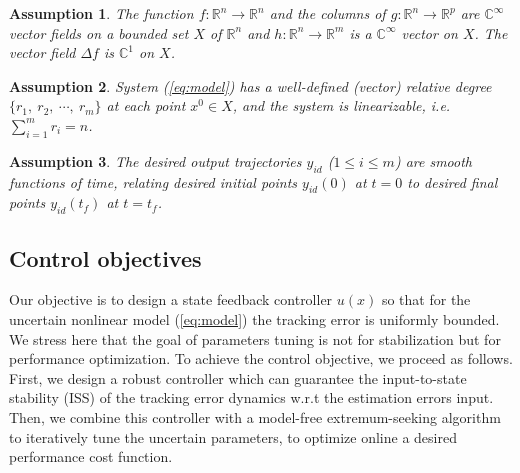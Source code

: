 \documentclass[twoside,leqno,onecolumn]{article}
\newtheorem{assumption}{Assumption}
\begin{document}
\begin{assumption}
The function $f:\mathbb{R}^n \rightarrow \mathbb{R}^n$ and the
columns of $g: \mathbb{R}^n \rightarrow \mathbb{R}^p$ are
$\mathbb{C}^{\infty}$ vector fields on a bounded set $X$ of
$\mathbb{R}^n$ and $h : \mathbb{R}^n \rightarrow \mathbb{R}^m$ is
a $\mathbb{C}^{\infty}$ vector on $X$. The vector field $\Delta f
$ is $\mathbb{C}^1$ on $X$.
\end{assumption}

\begin{assumption}
System (\ref{eq:model}) has a well-defined (vector) relative
degree $\{r_1,~r_2,~\cdots,~r_m\}$ at each point $x^0\in X$, and
the system is linearizable, i.e. $\sum_{i=1}^m r_i=n$.
\end{assumption}



\begin{assumption}
The desired output trajectories $y_{id}$ ($1\leq i \leq m$) are
smooth functions of time, relating desired initial points
$y_{id}(0)$ at $t=0$ to desired final points $y_{id}(t_f)$ at
$t=t_f$.
\end{assumption}

\subsection{Control objectives}
Our objective is to design a state feedback controller $u(x)$ so
that  for the uncertain nonlinear model (\ref{eq:model}) the
tracking error is uniformly bounded. We stress here that the goal
of parameters tuning is not for stabilization but for performance
optimization. To achieve the control objective, we proceed as
follows. First, we design a robust controller which can guarantee
the input-to-state stability (ISS) of the tracking error dynamics
w.r.t the estimation errors input. Then, we combine this
controller with a model-free extremum-seeking algorithm to
iteratively tune the uncertain parameters, to optimize online a
desired performance cost function.
\end{document}
